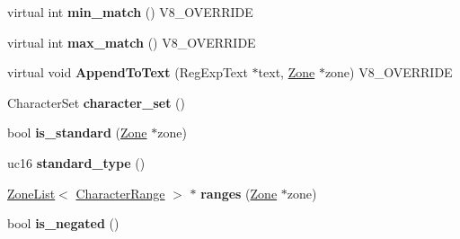 \begin{DoxyCompactItemize}
\item 
\hypertarget{classv8_1_1internal_1_1_v8___f_i_n_a_l_ac4abdb29d336dc24ef96695ac805b1ac}{}virtual int {\bfseries min\+\_\+match} () V8\+\_\+\+O\+V\+E\+R\+R\+I\+D\+E\label{classv8_1_1internal_1_1_v8___f_i_n_a_l_ac4abdb29d336dc24ef96695ac805b1ac}

\item 
\hypertarget{classv8_1_1internal_1_1_v8___f_i_n_a_l_a0b9dd74bfd4f1172c26a072c44da8669}{}virtual int {\bfseries max\+\_\+match} () V8\+\_\+\+O\+V\+E\+R\+R\+I\+D\+E\label{classv8_1_1internal_1_1_v8___f_i_n_a_l_a0b9dd74bfd4f1172c26a072c44da8669}

\item 
\hypertarget{classv8_1_1internal_1_1_v8___f_i_n_a_l_a1f8586ff5e4b913358f02f3c88eff2e3}{}virtual void {\bfseries Append\+To\+Text} (Reg\+Exp\+Text $\ast$text, \hyperlink{classv8_1_1internal_1_1_zone}{Zone} $\ast$zone) V8\+\_\+\+O\+V\+E\+R\+R\+I\+D\+E\label{classv8_1_1internal_1_1_v8___f_i_n_a_l_a1f8586ff5e4b913358f02f3c88eff2e3}

\item 
\hypertarget{classv8_1_1internal_1_1_v8___f_i_n_a_l_a8024ba310222bd002de966687244cc14}{}Character\+Set {\bfseries character\+\_\+set} ()\label{classv8_1_1internal_1_1_v8___f_i_n_a_l_a8024ba310222bd002de966687244cc14}

\item 
\hypertarget{classv8_1_1internal_1_1_v8___f_i_n_a_l_aa0a465227acdfaa84e0c2e294b2c4afc}{}bool {\bfseries is\+\_\+standard} (\hyperlink{classv8_1_1internal_1_1_zone}{Zone} $\ast$zone)\label{classv8_1_1internal_1_1_v8___f_i_n_a_l_aa0a465227acdfaa84e0c2e294b2c4afc}

\item 
\hypertarget{classv8_1_1internal_1_1_v8___f_i_n_a_l_ad400838b6fe8683d93ccece6221bb5bd}{}uc16 {\bfseries standard\+\_\+type} ()\label{classv8_1_1internal_1_1_v8___f_i_n_a_l_ad400838b6fe8683d93ccece6221bb5bd}

\item 
\hypertarget{classv8_1_1internal_1_1_v8___f_i_n_a_l_a028367fa306538634f98b010e23a140a}{}\hyperlink{classv8_1_1internal_1_1_zone_list}{Zone\+List}$<$ \hyperlink{classv8_1_1internal_1_1_character_range}{Character\+Range} $>$ $\ast$ {\bfseries ranges} (\hyperlink{classv8_1_1internal_1_1_zone}{Zone} $\ast$zone)\label{classv8_1_1internal_1_1_v8___f_i_n_a_l_a028367fa306538634f98b010e23a140a}

\item 
\hypertarget{classv8_1_1internal_1_1_v8___f_i_n_a_l_af773abe0434cc56dab511ecb93e5b207}{}bool {\bfseries is\+\_\+negated} ()\label{classv8_1_1internal_1_1_v8___f_i_n_a_l_af773abe0434cc56dab511ecb93e5b207}


\end{DoxyCompactItemize}
